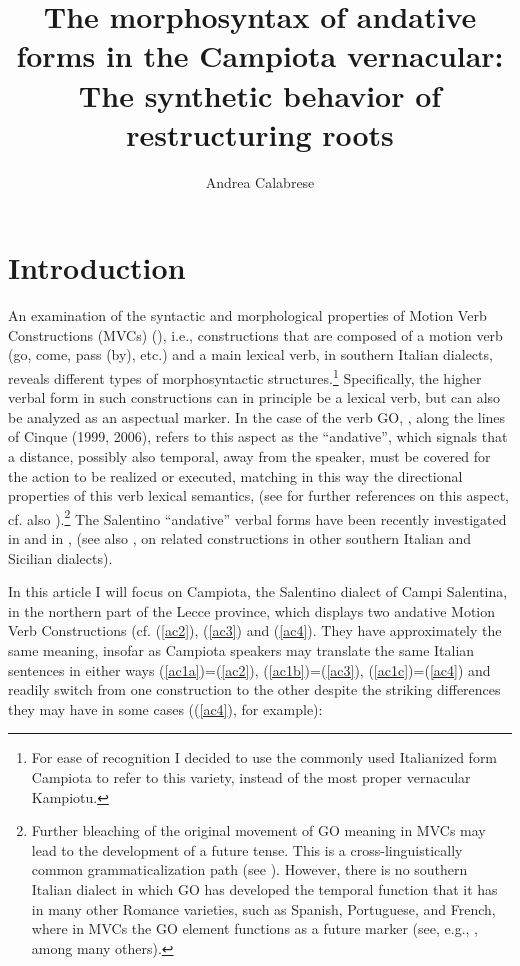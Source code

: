 \documentclass[output=paper]{langscibook}
\author{Andrea Calabrese\affiliation{University of Connecticut}}
\title[The morphosyntax of andative forms in the Campiota vernacular]
      {The morphosyntax of andative forms in the Campiota vernacular: The synthetic behavior of restructuring roots}
\begin{document}
\maketitle

\section{Introduction}


An examination of the syntactic and morphological properties of Motion Verb Constructions (MVCs) (\citealt{cruschina2013a, cruschina2021a}), i.e., constructions that are composed of a motion verb (go, come, pass (by), etc.) and a main lexical verb, in southern Italian dialects, reveals different types of morphosyntactic structures.\footnote{For ease of recognition I decided to use the commonly used Italianized form Campiota to refer to this variety, instead of the most proper vernacular Kampiotu.} Specifically, the higher verbal form in such constructions can in principle be a lexical verb, but can also be analyzed as an aspectual marker. In the case of the verb GO, \cite{cruschina2013a}, along the lines of Cinque (1999, 2006), refers to this aspect as the “andative”, which signals that a distance, possibly also temporal, away from the speaker, must be covered for the action to be realized or executed, matching in this way the directional properties of this verb lexical semantics, (see \cite{cinque2006a} for further references on this aspect, cf. also \cite{heine2018a}).\footnote{Further bleaching of the original movement of GO meaning in MVCs  may lead to the development of a future tense. This is a cross-linguistically common grammaticalization path (see \cite{bybee1994a}). However, there is no southern Italian dialect in which GO has developed the temporal function that it has in many other Romance varieties, such as Spanish, Portuguese, and French, where in MVCs the GO element functions as a future marker (see, e.g., \cite{squartini1998a}, among many others). }   The Salentino “andative” verbal forms have been recently investigated in \cite{ledgeway2016a} and in \cite{manzini2017a}, \cite{cardinaletti2019a} (see also \cite{andriani2017a, cardinaletti2001a, cardinaletti2003a, cruschina2013a, cruschina2021a}, \cite{caro2015a, caro2018a, caro2019a, caro2015b, manzini2005a} on related constructions in other southern Italian and Sicilian dialects). 

In this article I will focus on Campiota, the Salentino dialect of Campi Salentina, in the northern part of the Lecce province, which displays two andative Motion Verb Constructions (cf. (\ref{ac2}), (\ref{ac3}) and (\ref{ac4}). They have approximately the same meaning, insofar as Campiota speakers may translate the same Italian sentences in either ways (\ref{ac1a})=(\ref{ac2}), (\ref{ac1b})=(\ref{ac3}), (\ref{ac1c})=(\ref{ac4}) and readily switch from one construction to the other despite the striking differences they may have in some cases ((\ref{ac4}), for example): 
\end{document}
